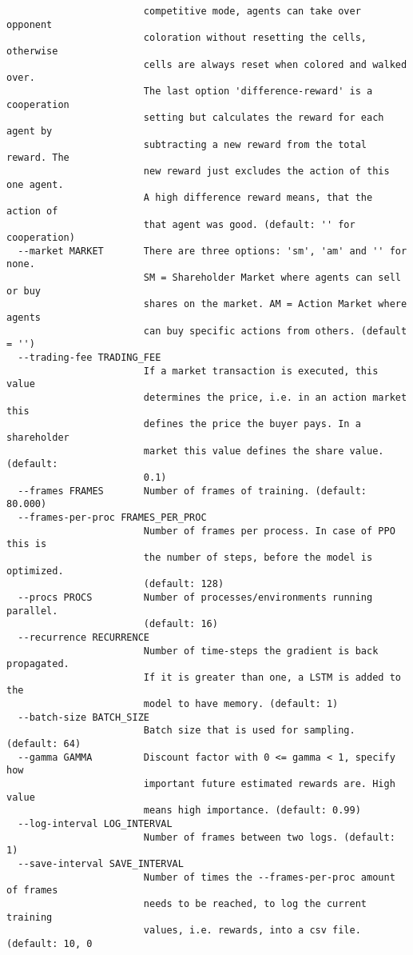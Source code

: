 {\begin{verbatim}
                        competitive mode, agents can take over opponent
                        coloration without resetting the cells, otherwise
                        cells are always reset when colored and walked over.
                        The last option 'difference-reward' is a cooperation
                        setting but calculates the reward for each agent by
                        subtracting a new reward from the total reward. The
                        new reward just excludes the action of this one agent.
                        A high difference reward means, that the action of
                        that agent was good. (default: '' for cooperation)
  --market MARKET       There are three options: 'sm', 'am' and '' for none.
                        SM = Shareholder Market where agents can sell or buy
                        shares on the market. AM = Action Market where agents
                        can buy specific actions from others. (default = '')
  --trading-fee TRADING_FEE
                        If a market transaction is executed, this value
                        determines the price, i.e. in an action market this
                        defines the price the buyer pays. In a shareholder
                        market this value defines the share value. (default:
                        0.1)
  --frames FRAMES       Number of frames of training. (default: 80.000)
  --frames-per-proc FRAMES_PER_PROC
                        Number of frames per process. In case of PPO this is
                        the number of steps, before the model is optimized.
                        (default: 128)
  --procs PROCS         Number of processes/environments running parallel.
                        (default: 16)
  --recurrence RECURRENCE
                        Number of time-steps the gradient is back propagated.
                        If it is greater than one, a LSTM is added to the
                        model to have memory. (default: 1)
  --batch-size BATCH_SIZE
                        Batch size that is used for sampling. (default: 64)
  --gamma GAMMA         Discount factor with 0 <= gamma < 1, specify how
                        important future estimated rewards are. High value
                        means high importance. (default: 0.99)
  --log-interval LOG_INTERVAL
                        Number of frames between two logs. (default: 1)
  --save-interval SAVE_INTERVAL
                        Number of times the --frames-per-proc amount of frames
                        needs to be reached, to log the current training
                        values, i.e. rewards, into a csv file. (default: 10, 0

\end{verbatim}}
